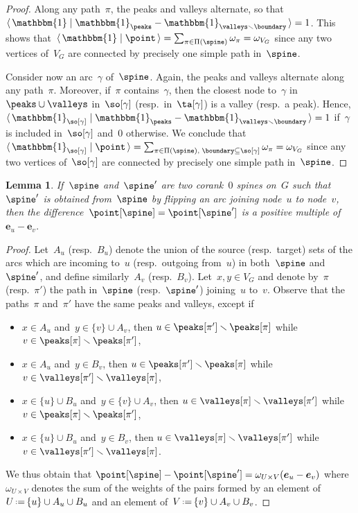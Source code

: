 \documentclass{amsart}
\newtheorem{lemma}[theorem]{Lemma}
\theoremstyle{definition}
\renewcommand{\b}[1]{{\boldsymbol{#1}}} %
\newcommand{\ssm}{\smallsetminus} %
\newcommand{\dotprod}[2]{\langle \, #1 \; | \; #2 \, \rangle} %
\newcommand{\one}{\mathbbm{1}} %
\newcommand{\eqdef}{\mbox{\,\raisebox{0.2ex}{\scriptsize\ensuremath{\mathrm:}}\ensuremath{=}\,}} %
\newcommand{\weight}{\omega} %
\begin{document}
\begin{proof}
  Along any path~$\pi$, the peaks and valleys alternate, so that~$\dotprod{\one}{\one_{\peaks} - \one_{\valleys \ssm \boundary}} = 1$.
  This shows that~$\dotprod{\one}{\point} = \sum_{\pi \in \Pi(\spine)} \weight_\pi = \weight_{V_G}$ since any two vertices of~$V_G$ are connected by precisely one simple path in~$\spine$.
  
  Consider now an arc~$\gamma$ of~$\spine$.
  Again, the peaks and valleys alternate along any path~$\pi$.
  Moreover, if~$\pi$ contains~$\gamma$, then the closest node to~$\gamma$ in~$\peaks \cup \valleys$ in~$\so[\gamma]$ (resp.~in~$\ta[\gamma]$) is a valley (resp.~a peak).
  Hence, $\dotprod{\one_{\so[\gamma]}}{\one_{\peaks} - \one_{\valleys \ssm \boundary}} = 1$ if~$\gamma$ is included in~$\so[\gamma]$ and~$0$ otherwise.
  We conclude that~$\dotprod{\one_{\so[\gamma]}}{\point} = \sum_{\pi \in \Pi(\spine), \; \boundary \subseteq \so[\gamma]} \weight_\pi = \weight_{V_G}$ since any two vertices of~$\so[\gamma]$ are connected by precisely one simple path in~$\spine$.
\end{proof}

\begin{lemma}
  \label{lem:flipDifference}
  If~$\spine$ and~$\spine'$ are two corank~$0$ spines on~$G$ such that~$\spine'$ is obtained from~$\spine$ by flipping an arc joining node~$u$ to node~$v$, then the difference~$\point[\spine] = \point[\spine']$ is a positive multiple of~$\b{e}_u - \b{e}_v$.
\end{lemma}

\begin{proof}
  Let~$A_u$ (resp.~$B_u$) denote the union of the source (resp.~target) sets of the arcs which are incoming to~$u$ (resp.~outgoing from~$u$) in both~$\spine$ and~$\spine'$, and define similarly~$A_v$ (resp.~$B_v$).
  Let~$x,y \in V_G$ and denote by~$\pi$ (resp.~$\pi'$) the path in~$\spine$ (resp.~$\spine'$) joining~$u$ to~$v$.
  Observe that the paths~$\pi$ and~$\pi'$ have the same peaks and valleys, except if
  \begin{itemize}
    \item $x \in A_u$ and~$y \in \{v\} \cup A_v$, then $u \in \peaks[\pi'] \ssm \peaks[\pi]$ while~$v \in \peaks[\pi] \ssm \peaks[\pi']$,
    \item $x \in A_u$ and~$y \in B_v$, then $u \in \peaks[\pi'] \ssm \peaks[\pi]$ while~$v \in \valleys[\pi'] \ssm \valleys[\pi]$,
    \item $x \in \{u\} \cup B_u$ and~$y \in \{v\} \cup A_v$, then $u \in \valleys[\pi] \ssm \valleys[\pi']$ while~$v \in \peaks[\pi] \ssm \peaks[\pi']$,
    \item $x \in \{u\} \cup B_u$ and~$y \in B_v$, then $u \in \valleys[\pi] \ssm \valleys[\pi']$ while~$v \in \valleys[\pi'] \ssm \valleys[\pi]$.
  \end{itemize}
  We thus obtain that
  \(
    \point[\spine] - \point[\spine'] = \weight_{U \times V} (\b{e}_u - \b{e}_v)
  \)
  where~$\weight_{U \times V}$ denotes the sum of the weights of the pairs formed by an element of~$U \eqdef \{u\} \cup A_u \cup B_u$ and an element of~$V \eqdef \{v\} \cup A_v \cup B_v$.
\end{proof}
\end{document}
